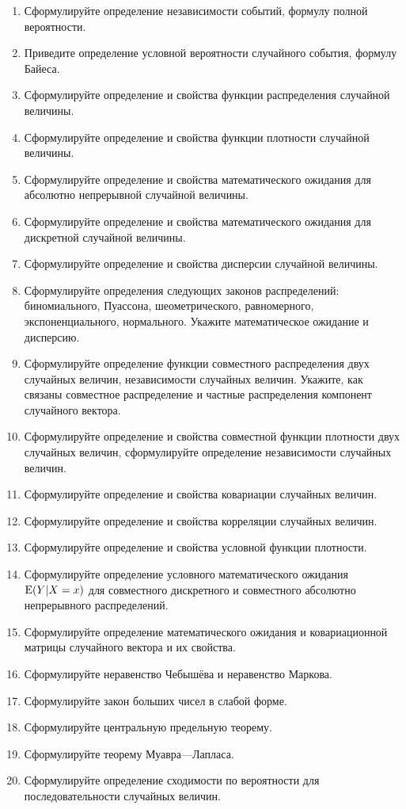 \begin{enumerate}
\item Сформулируйте определение независимости событий, формулу полной вероятности.
\item Приведите определение условной вероятности случайного события, формулу Байеса.
\item Сформулируйте определение и свойства функции распределения случайной величины.
\item Сформулируйте определение и свойства функции плотности случайной величины.
\item Сформулируйте определение и свойства математического ожидания для абсолютно непрерывной случайной величины.
\item Сформулируйте определение и свойства математического ожидания для дискретной случайной величины.
\item Сформулируйте определение и свойства дисперсии случайной величины.
\item Сформулируйте определения следующих законов распределений: биномиального, Пуассона, шеометрического, равномерного, экспоненциального, нормального. Укажите математическое ожидание и дисперсию.
\item Сформулируйте определение функции совместного распределения двух случайных величин, независимости случайных величин. Укажите, как связаны совместное распределение и частные распределения компонент случайного вектора.
\item	Сформулируйте определение и свойства совместной функции плотности двух случайных величин, сформулируйте определение независимости случайных величин.
\item Сформулируйте определение и свойства ковариации случайных величин.
\item Сформулируйте определение и свойства корреляции случайных величин.
\item Сформулируйте определение и свойства условной функции плотности.
\item Сформулируйте определение  условного математического ожидания $\operatorname{E}(Y|X=x)$ для совместного дискретного и совместного абсолютно непрерывного распределений.
\item Сформулируйте определение математического ожидания и ковариационной матрицы случайного вектора и их свойства.
\item Сформулируйте неравенство Чебышёва и неравенство Маркова.
\item Сформулируйте закон больших чисел в слабой форме.
\item Сформулируйте центральную предельную теорему.
\item Сформулируйте теорему Муавра—Лапласа.
\item Сформулируйте определение сходимости по вероятности для последовательности случайных величин.
\end{enumerate}

